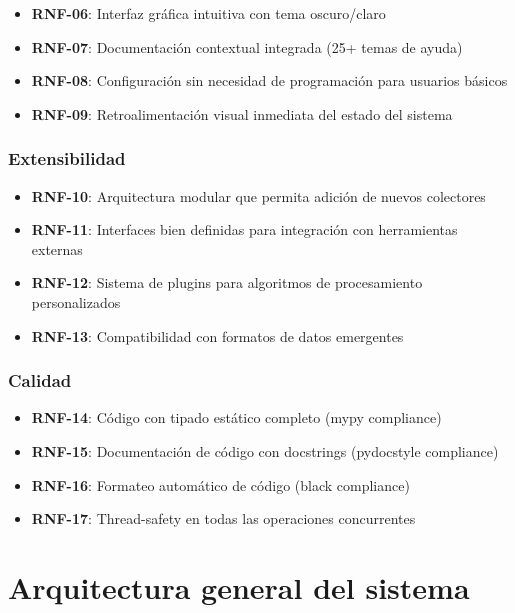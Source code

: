 \begin{itemize}
    \item \textbf{RNF-06}: Interfaz gráfica intuitiva con tema oscuro/claro
    \item \textbf{RNF-07}: Documentación contextual integrada (25+ temas de ayuda)
    \item \textbf{RNF-08}: Configuración sin necesidad de programación para usuarios básicos
    \item \textbf{RNF-09}: Retroalimentación visual inmediata del estado del sistema
\end{itemize}

\subsubsection{Extensibilidad}
\label{subsubsec:req_extensibilidad}

\begin{itemize}
    \item \textbf{RNF-10}: Arquitectura modular que permita adición de nuevos colectores
    \item \textbf{RNF-11}: Interfaces bien definidas para integración con herramientas externas
    \item \textbf{RNF-12}: Sistema de plugins para algoritmos de procesamiento personalizados
    \item \textbf{RNF-13}: Compatibilidad con formatos de datos emergentes
\end{itemize}

\subsubsection{Calidad}
\label{subsubsec:req_calidad}

\begin{itemize}
    \item \textbf{RNF-14}: Código con tipado estático completo (mypy compliance)
    \item \textbf{RNF-15}: Documentación de código con docstrings (pydocstyle compliance)
    \item \textbf{RNF-16}: Formateo automático de código (black compliance)
    \item \textbf{RNF-17}: Thread-safety en todas las operaciones concurrentes
\end{itemize}

\section{Arquitectura general del sistema}
\label{sec:arquitectura_general}


